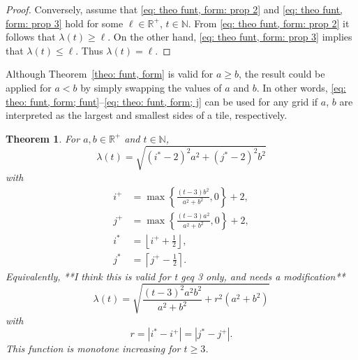 \documentclass[12pt, a4paper]{article}
\newcommand{\funl}{\lambda} %
\newcommand{\len}{\ell} %
\newcommand{\tiles}{t} %
\newcommand{\isolr}{i^+}
\newcommand{\jsolr}{j^+}
\newcommand{\isoli}{i^\ast}
\newcommand{\jsoli}{j^\ast}
\newcommand{\roundterm}{r}
\newtheorem{theorem}{Theorem}%
\begin{document}
\begin{proof}
Conversely, assume that \eqref{eq: theo funt, form: prop 2} and \eqref{eq: theo funt, form: prop 3} hold for some $\len \in \mathbb R^+$, $\tiles \in \mathbb N$. From \eqref{eq: theo funt, form: prop 2} it follows that  $\funl(\tiles) \geq \len$. On the other hand, \eqref{eq: theo funt, form: prop 3} implies that $\funl(\tiles) \leq \len$. Thus $\funl(\tiles)=\len$.
\end{proof}

Although Theorem~\ref{theo: funt, form} is valid for $a \geq b$, the result could be applied for $a < b$ by simply swapping the values of $a$ and $b$. In other words, \eqref{eq: theo: funt, form; funt}--\eqref{eq: theo: funt, form; j}
can be used for any grid if $a$, $b$ are interpreted as the largest and smallest sides of a tile, respectively.

\begin{theorem}
\label{theo: funl, form}
For $a, b \in \mathbb R^+$ and $\tiles \in \mathbb N$,
\begin{equation}
\label{eq: theo: funl, form; funl}
\funl(\tiles) = \sqrt{(\isoli-2)^2 a^2 + (\jsoli-2)^2 b^2}
\end{equation}
with
\begin{align}
\label{eq: theo: funl, form; isolr}
\isolr &= \max\left\{ \frac{(\tiles-3) b^2}{a^2+b^2}, 0 \right\} + 2, \\
\label{eq: theo: funl, form; jsolr}
\jsolr &= \max\left\{ \frac{(\tiles-3) a^2}{a^2+b^2}, 0 \right\} + 2, \\
\label{eq: theo: funl, form; isoli}
\isoli &= \left\lfloor \isolr + \frac 1 2 \right\rfloor, \\
\label{eq: theo: funl, form; jsoli}
\jsoli &= \left\lceil \jsolr - \frac 1 2 \right\rceil.
\end{align}
Equivalently, **I think this is valid for t geq 3 only, and needs a modification**
\begin{equation}
\label{eq: theo: funl, form; funl 2}
\funl(\tiles) = \sqrt{\frac{(t-3)^2 a^2 b^2}{a^2+b^2} + \roundterm^2(a^2+b^2)}
\end{equation}
with
\begin{equation}
\label{eq: roundterm}
\roundterm = |\isoli - \isolr| = |\jsoli - \jsolr|.
\end{equation}
This function is monotone increasing for $\tiles \geq 3$.
\end{theorem}
\end{document}
